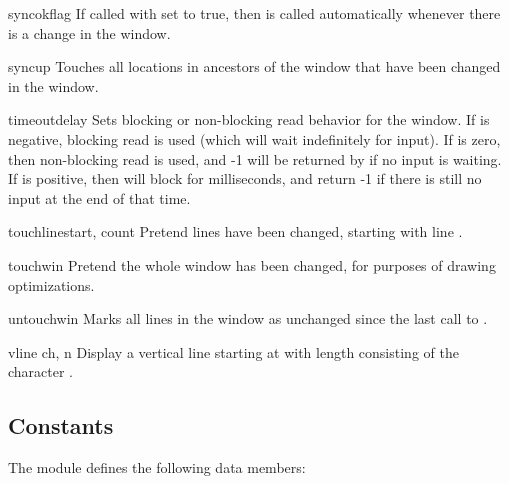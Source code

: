 \begin{methoddesc}[window]{syncok}{flag}
If called with  set to true, then  is
called automatically whenever there is a change in the window.
\end{methoddesc}

\begin{methoddesc}[window]{syncup}{}
Touches all locations in ancestors of the window that have been changed in 
the window.  
\end{methoddesc}

\begin{methoddesc}[window]{timeout}{delay}
Sets blocking or non-blocking read behavior for the window.  If
 is negative, blocking read is used (which will wait
indefinitely for input).  If  is zero, then non-blocking
read is used, and -1 will be returned by  if no input
is waiting.  If  is positive, then  will
block for  milliseconds, and return -1 if there is still no
input at the end of that time.
\end{methoddesc}

\begin{methoddesc}[window]{touchline}{start, count}
Pretend  lines have been changed, starting with line
.
\end{methoddesc}

\begin{methoddesc}[window]{touchwin}{}
Pretend the whole window has been changed, for purposes of drawing
optimizations.
\end{methoddesc}

\begin{methoddesc}[window]{untouchwin}{}
Marks all lines in  the  window  as unchanged since the last call to
. 
\end{methoddesc}

\begin{methoddesc}[window]{vline}{ ch, n}
Display a vertical line starting at  with
length  consisting of the character .
\end{methoddesc}

\subsection{Constants}

The  module defines the following data members:

